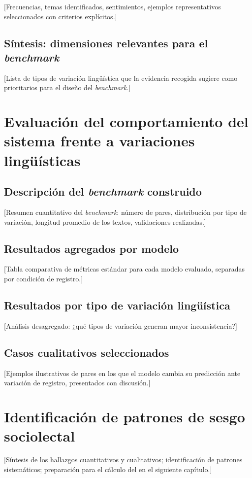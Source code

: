 [Frecuencias, temas identificados, sentimientos, ejemplos representativos
seleccionados con criterios explícitos.]

\subsection{Síntesis: dimensiones relevantes para el \textit{benchmark}}

[Lista de tipos de variación lingüística que la evidencia recogida sugiere
como prioritarios para el diseño del \emph{benchmark}.]

\section{Evaluación del comportamiento del sistema frente a variaciones lingüísticas}
\label{sec:resultados-experimentos}

\subsection{Descripción del \textit{benchmark} construido}

[Resumen cuantitativo del \emph{benchmark}: número de pares, distribución por
tipo de variación, longitud promedio de los textos, validaciones realizadas.]

\subsection{Resultados agregados por modelo}

[Tabla comparativa de métricas estándar para cada modelo evaluado, separadas
por condición de registro.]

\subsection{Resultados por tipo de variación lingüística}

[Análisis desagregado: ¿qué tipos de variación generan mayor inconsistencia?]

\subsection{Casos cualitativos seleccionados}

[Ejemplos ilustrativos de pares en los que el modelo cambia su predicción
ante variación de registro, presentados con discusión.]

\section{Identificación de patrones de sesgo sociolectal}
\label{sec:patrones}

[Síntesis de los hallazgos cuantitativos y cualitativos; identificación de
patrones sistemáticos; preparación para el cálculo del \INS en el siguiente
capítulo.]
